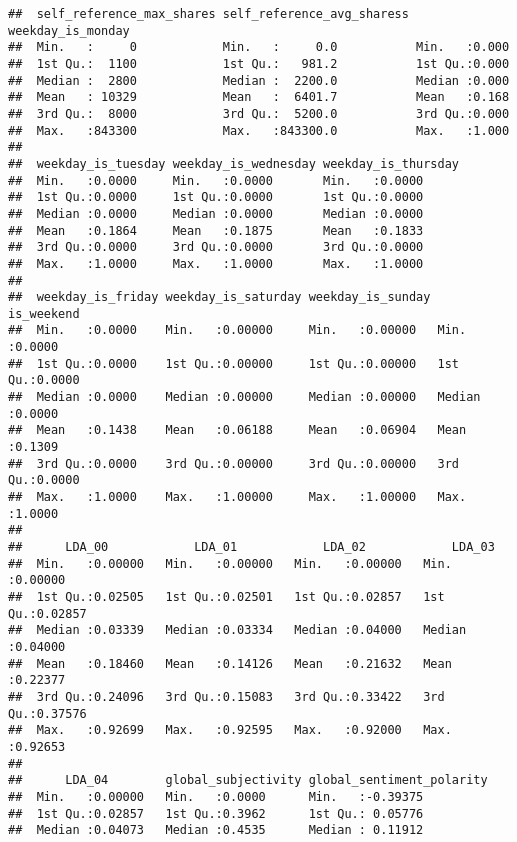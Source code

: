 \documentclass[]{article}
\begin{document}
\begin{verbatim}
##  self_reference_max_shares self_reference_avg_sharess weekday_is_monday
##  Min.   :     0            Min.   :     0.0           Min.   :0.000    
##  1st Qu.:  1100            1st Qu.:   981.2           1st Qu.:0.000    
##  Median :  2800            Median :  2200.0           Median :0.000    
##  Mean   : 10329            Mean   :  6401.7           Mean   :0.168    
##  3rd Qu.:  8000            3rd Qu.:  5200.0           3rd Qu.:0.000    
##  Max.   :843300            Max.   :843300.0           Max.   :1.000    
##                                                                        
##  weekday_is_tuesday weekday_is_wednesday weekday_is_thursday
##  Min.   :0.0000     Min.   :0.0000       Min.   :0.0000     
##  1st Qu.:0.0000     1st Qu.:0.0000       1st Qu.:0.0000     
##  Median :0.0000     Median :0.0000       Median :0.0000     
##  Mean   :0.1864     Mean   :0.1875       Mean   :0.1833     
##  3rd Qu.:0.0000     3rd Qu.:0.0000       3rd Qu.:0.0000     
##  Max.   :1.0000     Max.   :1.0000       Max.   :1.0000     
##                                                             
##  weekday_is_friday weekday_is_saturday weekday_is_sunday   is_weekend    
##  Min.   :0.0000    Min.   :0.00000     Min.   :0.00000   Min.   :0.0000  
##  1st Qu.:0.0000    1st Qu.:0.00000     1st Qu.:0.00000   1st Qu.:0.0000  
##  Median :0.0000    Median :0.00000     Median :0.00000   Median :0.0000  
##  Mean   :0.1438    Mean   :0.06188     Mean   :0.06904   Mean   :0.1309  
##  3rd Qu.:0.0000    3rd Qu.:0.00000     3rd Qu.:0.00000   3rd Qu.:0.0000  
##  Max.   :1.0000    Max.   :1.00000     Max.   :1.00000   Max.   :1.0000  
##                                                                          
##      LDA_00            LDA_01            LDA_02            LDA_03       
##  Min.   :0.00000   Min.   :0.00000   Min.   :0.00000   Min.   :0.00000  
##  1st Qu.:0.02505   1st Qu.:0.02501   1st Qu.:0.02857   1st Qu.:0.02857  
##  Median :0.03339   Median :0.03334   Median :0.04000   Median :0.04000  
##  Mean   :0.18460   Mean   :0.14126   Mean   :0.21632   Mean   :0.22377  
##  3rd Qu.:0.24096   3rd Qu.:0.15083   3rd Qu.:0.33422   3rd Qu.:0.37576  
##  Max.   :0.92699   Max.   :0.92595   Max.   :0.92000   Max.   :0.92653  
##                                                                         
##      LDA_04        global_subjectivity global_sentiment_polarity
##  Min.   :0.00000   Min.   :0.0000      Min.   :-0.39375         
##  1st Qu.:0.02857   1st Qu.:0.3962      1st Qu.: 0.05776         
##  Median :0.04073   Median :0.4535      Median : 0.11912         

\end{verbatim}
\end{document}
